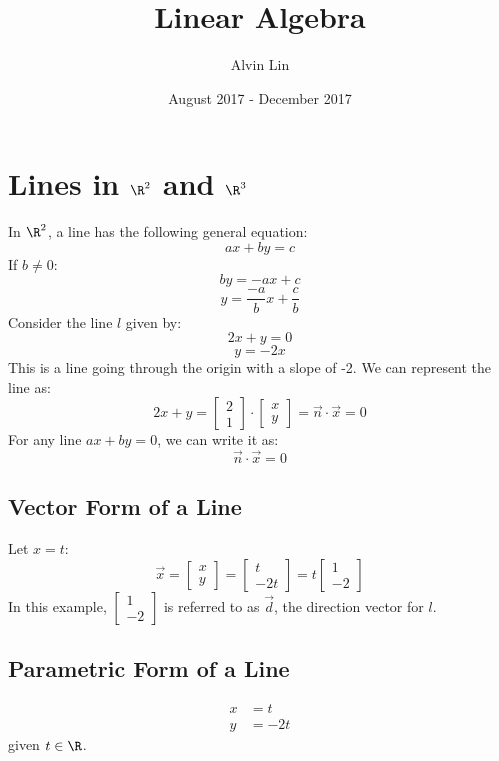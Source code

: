 \documentclass{math}
\title{Linear Algebra}
\author{Alvin Lin}
\date{August 2017 - December 2017}
\begin{document}
\maketitle

\section*{Lines in \( \R^2 \) and \( \R^3 \)}
In \( \R^2 \), a line has the following general equation:
\[ ax+by = c \]
If \( b \ne 0 \):
\[ by = -ax+c \]
\[ y = \frac{-a}{b}x+\frac{c}{b} \]
Consider the line \( l \) given by:
\[ 2x+y = 0 \]
\[ y = -2x \]
This is a line going through the origin with a slope of -2. We can represent
the line as:
\[ 2x+y = \begin{bmatrix}2 \\ 1\end{bmatrix}\cdot
  \begin{bmatrix}x \\ y\end{bmatrix} = \vec{n}\cdot\vec{x} = 0 \]
For any line \( ax+by = 0 \), we can write it as:
\[ \vec{n}\cdot\vec{x} = 0 \]

\subsection*{Vector Form of a Line}
Let \( x = t \):
\[ \vec{x} = \begin{bmatrix}x \\ y\end{bmatrix} =
  \begin{bmatrix}t \\ -2t\end{bmatrix} = t\begin{bmatrix}1 \\-2\end{bmatrix} \]
In this example, \( \begin{bmatrix}1 \\ -2\end{bmatrix} \) is referred to as
\( \vec{d} \), the direction vector for \( l \).

\subsection*{Parametric Form of a Line}
\begin{align*}
  x &= t \\
  y &= -2t
\end{align*}
given \( t\in\R \).
\end{document}
